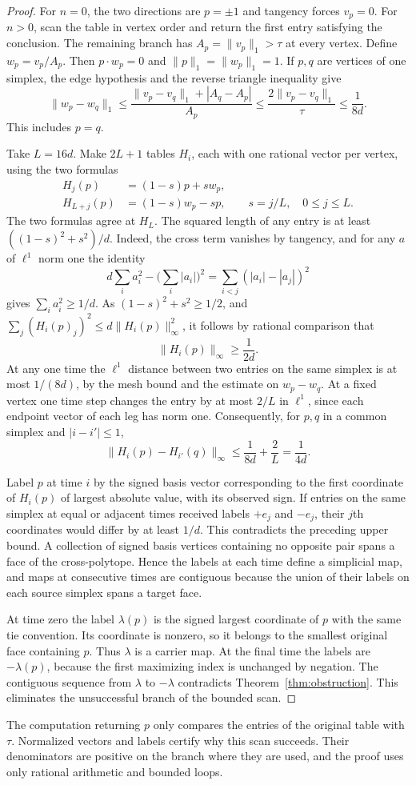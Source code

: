 \begin{proof}
For $n=0$, the two directions are $p=\pm1$ and tangency forces
$v_p=0$. For $n>0$, scan the table in vertex order and return the
first entry satisfying the conclusion. The remaining branch has
$A_p=\|v_p\|_1>\tau$ at every vertex. Define $w_p=v_p/A_p$.
Then $p\cdot w_p=0$ and $\|p\|_1=\|w_p\|_1=1$. If $p,q$
are vertices of one simplex, the edge hypothesis and the reverse
triangle inequality give
\[
 \|w_p-w_q\|_1
 \leq \frac{\|v_p-v_q\|_1+|A_q-A_p|}{A_p}
 \leq \frac{2\|v_p-v_q\|_1}{\tau}
 \leq \frac1{8d}.
\]
This includes $p=q$.

Take $L=16d$. Make $2L+1$ tables $H_i$, each with one rational
vector per vertex, using the two formulas
\[
 \begin{split}
 H_j(p)&=(1-s)p+s w_p,\\
 H_{L+j}(p)&=(1-s)w_p-s p,
 \qquad s=j/L,\quad 0\leq j\leq L .
 \end{split}
\]
The two formulas agree at $H_L$. The squared length of any entry
is at least $((1-s)^2+s^2)/d$. Indeed, the cross term vanishes by
tangency, and for any $a$ of $\ell^1$ norm one the identity
\[
 d\sum_i a_i^2-\Big(\sum_i|a_i|\Big)^2
   =\sum_{i<j}(|a_i|-|a_j|)^2
\]
gives $\sum_i a_i^2\geq 1/d$. As $(1-s)^2+s^2\geq 1/2$,
and $\sum_j (H_i(p)_j)^2\leq d\|H_i(p)\|_\infty^2$, it follows
by rational comparison that
\[
                      \|H_i(p)\|_\infty\geq\frac{1}{2d}.
\]
At any one time the $\ell^1$ distance between two entries on the
same simplex is at most $1/(8d)$, by the mesh bound and the estimate
on $w_p-w_q$. At a fixed vertex one time step changes the entry by
at most $2/L$ in $\ell^1$, since each endpoint vector of each leg has
norm one. Consequently, for $p,q$ in a common simplex and
$|i-i'|\leq1$,
\[
       \|H_i(p)-H_{i'}(q)\|_\infty
        \leq \frac{1}{8d}+\frac{2}{L}=\frac{1}{4d}.
\]

Label $p$ at time $i$ by the signed basis vector corresponding to the
first coordinate of $H_i(p)$ of largest absolute value, with its
observed sign. If entries on the same simplex at equal or adjacent
times received labels $+e_j$ and $-e_j$, their $j$th coordinates
would differ by at least $1/d$. This contradicts the preceding upper
bound. A collection of signed basis vertices containing no opposite
pair spans a face of the cross-polytope. Hence the labels at each
time define a simplicial map, and maps at consecutive times are
contiguous because the union of their labels on each source simplex
spans a target face.

At time zero the label $\lambda(p)$ is the signed largest coordinate
of $p$ with the same tie convention. Its coordinate is nonzero, so
it belongs to the smallest original face containing $p$. Thus
$\lambda$ is a carrier map. At the final time the labels are
$-\lambda(p)$, because the first maximizing index is unchanged
by negation. The contiguous sequence from $\lambda$ to $-\lambda$
contradicts Theorem~\ref{thm:obstruction}. This eliminates the
unsuccessful branch of the bounded scan.
\end{proof}

The computation returning $p$ only compares the entries of the
original table with $\tau$. Normalized vectors and labels certify
why this scan succeeds. Their denominators are positive on the branch
where they are used, and the proof uses only rational arithmetic and
bounded loops.
